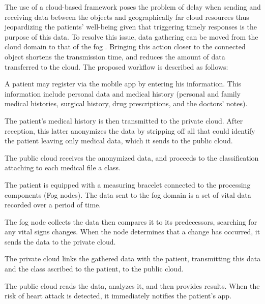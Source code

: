 The use of a cloud-based framework poses the problem of delay when sending and receiving data between the objects and geographically far cloud resources thus jeopardizing the patients' well-being given that triggering timely responses is the purpose of this data. To resolve this issue, data gathering can be moved from the cloud domain to that of the fog \cite{BonomiMZA12}. Bringing this action closer to the connected object shortens the transmission time, and reduces the amount of data transferred to the cloud.
The proposed workflow is described as follows:
	\begin{compactitem}
		\item A patient may register via the mobile app by entering his information. This information include personal data and medical history (personal and family medical histories, surgical history, drug prescriptions, and the doctors' notes). 
		\item The patient's medical history is then transmitted to the private cloud. After reception, this latter anonymizes the data by stripping off all that could identify the patient leaving only medical data, which it sends to the public cloud.
		\item The public cloud receives the anonymized data, and proceeds to the classification attaching to each medical file a class.
		\item The patient is equipped with a  measuring bracelet connected to the processing components (Fog nodes). The data sent to the fog domain is a set of vital data recorded over a period of time. 
		\item The fog node collects the data then compares it to its predecessors, searching for any vital signs changes. When the node determines that a change has occurred, it sends the data to the private cloud. 
		\item The private cloud links the gathered data with the patient, transmitting this data and the class ascribed to the patient, to the public cloud.
		\item The public cloud reads the data, analyzes it, and then provides results. When the risk of heart attack is detected, it immediately notifies the patient's app.
	\end{compactitem}


